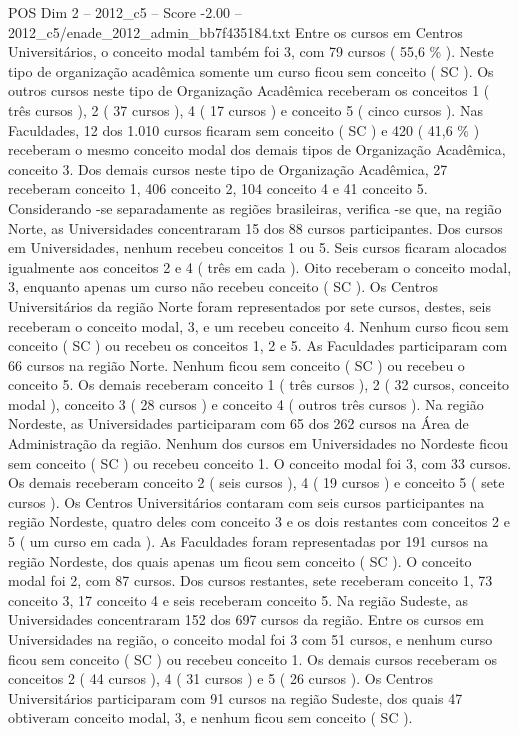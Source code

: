 \begin{textsample}{POS Dim 2 – 2012\_c5 – Score -2.00 – 2012\_c5/enade\_2012\_admin\_bb7f435184.txt}
Entre os cursos em Centros Universitários, o conceito modal também foi 3, com 79 cursos ( 55,6 \% ).
Neste tipo de organização acadêmica somente um curso ficou sem conceito ( SC ).
Os outros cursos neste tipo de Organização Acadêmica receberam os conceitos 1 ( três cursos ), 2 ( 37 cursos ), 4 ( 17 cursos ) e conceito 5 ( cinco cursos ).
Nas Faculdades, 12 dos 1.010 cursos ficaram sem conceito ( SC ) e 420 ( 41,6 \% ) receberam o mesmo conceito modal dos demais tipos de Organização Acadêmica, conceito 3.
Dos demais cursos neste tipo de Organização Acadêmica, 27 receberam conceito 1, 406 conceito 2, 104 conceito 4 e 41 conceito 5.
Considerando -se separadamente as regiões brasileiras, verifica -se que, na região Norte, as Universidades concentraram 15 dos 88 cursos participantes.
Dos cursos em Universidades, nenhum recebeu conceitos 1 ou 5.
Seis cursos ficaram alocados igualmente aos conceitos 2 e 4 ( três em cada ).
Oito receberam o conceito modal, 3, enquanto apenas um curso não recebeu conceito ( SC ).
Os Centros Universitários da região Norte foram representados por sete cursos, destes, seis receberam o conceito modal, 3, e um recebeu conceito 4.
Nenhum curso ficou sem conceito ( SC ) ou recebeu os conceitos 1, 2 e 5.
As Faculdades participaram com 66 cursos na região Norte.
Nenhum ficou sem conceito ( SC ) ou recebeu o conceito 5.
Os demais receberam conceito 1 ( três cursos ), 2 ( 32 cursos, conceito modal ), conceito 3 ( 28 cursos ) e conceito 4 ( outros três cursos ).
Na região Nordeste, as Universidades participaram com 65 dos 262 cursos na Área de Administração da região.
Nenhum dos cursos em Universidades no Nordeste ficou sem conceito ( SC ) ou recebeu conceito 1.
O conceito modal foi 3, com 33 cursos.
Os demais receberam conceito 2 ( seis cursos ), 4 ( 19 cursos ) e conceito 5 ( sete cursos ).
Os Centros Universitários contaram com seis cursos participantes na região Nordeste, quatro deles com conceito 3 e os dois restantes com conceitos 2 e 5 ( um curso em cada ).
As Faculdades foram representadas por 191 cursos na região Nordeste, dos quais apenas um ficou sem conceito ( SC ).
O conceito modal foi 2, com 87 cursos.
Dos cursos restantes, sete receberam conceito 1, 73 conceito 3, 17 conceito 4 e seis receberam conceito 5.
Na região Sudeste, as Universidades concentraram 152 dos 697 cursos da região.
Entre os cursos em Universidades na região, o conceito modal foi 3 com 51 cursos, e nenhum curso ficou sem conceito ( SC ) ou recebeu conceito 1.
Os demais cursos receberam os conceitos 2 ( 44 cursos ), 4 ( 31 cursos ) e 5 ( 26 cursos ).
Os Centros Universitários participaram com 91 cursos na região Sudeste, dos quais 47 obtiveram conceito modal, 3, e nenhum ficou sem conceito ( SC ).

\end{textsample}
